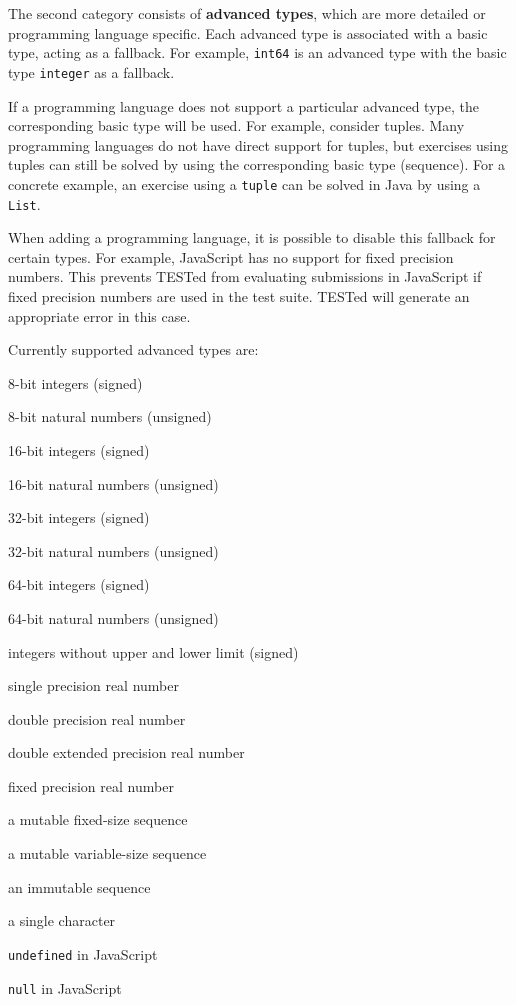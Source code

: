 \documentclass[../main]{subfiles}
\begin{document}
The second category consists of \textbf{advanced types}, which are more detailed or programming language specific.
Each advanced type is associated with a basic type, acting as a fallback.
For example, \texttt{int64} is an advanced type with the basic type \texttt{integer} as a fallback.

If a programming language does not support a particular advanced type, the corresponding basic type will be used.
For example, consider tuples.
Many programming languages do not have direct support for tuples, but exercises using tuples can still be solved by using the corresponding basic type (sequence).
For a concrete example, an exercise using a \texttt{tuple} can be solved in Java by using a \texttt{List}.

When adding a programming language, it is possible to disable this fallback for certain types.
For example, JavaScript has no support for fixed precision numbers.
This prevents TESTed from evaluating submissions in JavaScript if fixed precision numbers are used in the test suite.
TESTed will generate an appropriate error in this case.

Currently supported advanced types are:

\begin{description}[noitemsep]
    \item[\texttt{int8}] 8-bit integers (signed)
    \item[\texttt{uint8}] 8-bit natural numbers (unsigned)
    \item[\texttt{int16}] 16-bit integers (signed)
    \item[\texttt{uint16}] 16-bit natural numbers (unsigned)
    \item[\texttt{int32}] 32-bit integers (signed)
    \item[\texttt{uint32}] 32-bit natural numbers (unsigned)
    \item[\texttt{int64}] 64-bit integers (signed)
    \item[\texttt{uint64}] 64-bit natural numbers (unsigned)
    \item[\texttt{bigint}] integers without upper and lower limit (signed)
    \item[\texttt{single\_precision}] single precision real number
    \item[\texttt{double\_precision}] double precision real number
    \item[\texttt{double\_extended}] double extended precision real number
    \item[\texttt{fixed\_precision}] fixed precision real number
    \item[\texttt{array}] a mutable fixed-size sequence
    \item[\texttt{list}] a mutable variable-size sequence
    \item[\texttt{tuple}] an immutable sequence
    \item[\texttt{char}] a single character
    \item[\texttt{undefined}] \texttt{undefined} in JavaScript
    \item[\texttt{null}] \texttt{null} in JavaScript
\end{description}
\end{document}
